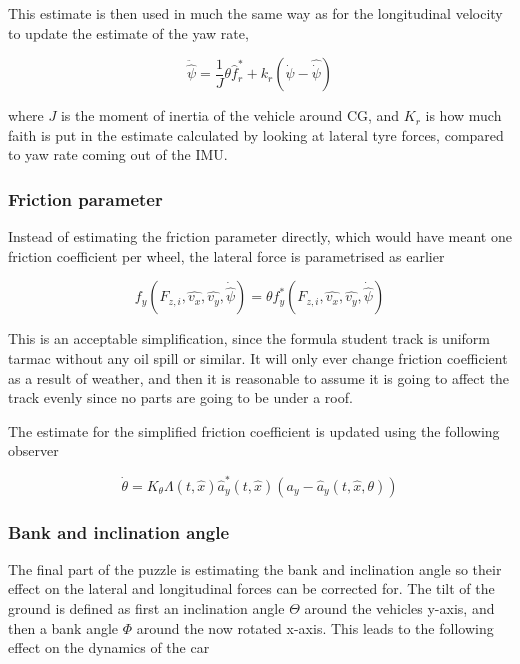 This estimate is then used in much the same way as for the longitudinal velocity to update the estimate of the yaw rate,

\begin{equation}
    \ddot{\hat{\psi}} = \frac{1}{J}\theta \hat{f}_r^* + k_r(\dot{\psi}-\hat{\dot{\psi}})
\end{equation}

where $J$ is the moment of inertia of the vehicle around CG, and $K_r$ is how much faith is put in the estimate calculated by looking at lateral tyre forces, compared to yaw rate coming out of the IMU. 

\subsubsection{Friction parameter}
Instead of estimating the friction parameter directly, which would have meant one friction coefficient per wheel, the lateral force is parametrised as earlier

\begin{equation}
    f_y(F_{z,i}, \hat{v_x}, \hat{v_y}, \dot{\hat{\psi}}) =\theta f_y^*(F_{z,i}, \hat{v_x}, \hat{v_y}, \dot{\hat{\psi}}) 
\end{equation}

This is an acceptable simplification, since the formula student track is uniform tarmac without any oil spill or similar. It will only ever change friction coefficient as a result of weather, and then it is reasonable to assume it is going to affect the track evenly since no parts are going to be under a roof. 

The estimate for the simplified friction coefficient is updated using the following observer

\begin{equation}
    \dot{\theta} = K_{\theta}\Lambda (t, \hat{x})\hat{a}_y^*(t,\hat{x})(a_y - \hat{a}_y(t,\hat{x},\theta))
\end{equation}

\subsubsection{Bank and inclination angle}

The final part of the puzzle is estimating the bank and inclination angle so their effect on the lateral and longitudinal forces can be corrected for. The tilt of the ground is defined as first an inclination angle $\Theta$ around the vehicles y-axis, and then a bank angle $\Phi$ around the now rotated x-axis. This leads to the following effect on the dynamics of the car

